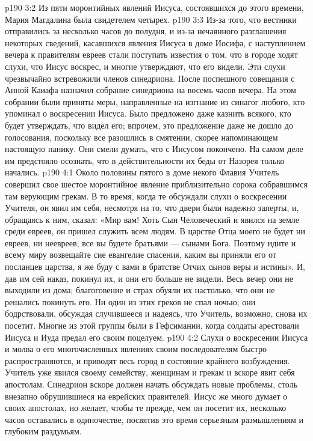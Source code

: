 \vs p190 3:2 \pc Из пяти моронтийных явлений Иисуса, состоявшихся до этого времени, Мария Магдалина была свидетелем четырех.
\vs p190 3:3 \pc Из\hyp{}за того, что вестники отправились за несколько часов до полудня, и из\hyp{}за нечаянного разглашения некоторых сведений, касавшихся явления Иисуса в доме Иосифа, с наступлением вечера к правителям евреев стали поступать известия о том, что в городе ходят слухи, что Иисус воскрес, и многие утверждают, что его видели. Эти слухи чрезвычайно встревожили членов синедриона. После поспешного совещания с Анной Каиафа назначил собрание синедриона на восемь часов вечера. На этом собрании были приняты меры, направленные на изгнание из синагог любого, кто упоминал о воскресении Иисуса. Было предложено даже казнить всякого, кто будет утверждать, что видел его; впрочем, это предложение даже не дошло до голосования, поскольку все разошлись в смятении, скорее напоминающем настоящую панику. Они смели думать, что с Иисусом покончено. На самом деле им предстояло осознать, что в действительности их беды от Назорея только начались.
\vs p190 4:1 Около половины пятого в доме некого Флавия Учитель совершил свое шестое моронтийное явление приблизительно сорока собравшимся там верующим грекам. В то время, когда те обсуждали слухи о воскресении Учителя, он явил им себя, несмотря на то, что двери были надежно заперты, и, обращаясь к ним, сказал: «Мир вам! Хоть Сын Человеческий и явился на земле среди евреев, он пришел служить всем людям. В царстве Отца моего не будет ни евреев, ни неевреев; все вы будете братьями --- сынами Бога. Поэтому идите и всему миру возвещайте сие евангелие спасения, каким вы приняли его от посланцев царства, я же буду с вами в братстве Отчих сынов веры и истины». И, дав им сей наказ, покинул их, и они его больше не видели. Весь вечер они не выходили из дома; благоговение и страх обуяли их настолько, что они не решались покинуть его. Ни один из этих греков не спал ночью; они бодрствовали, обсуждая случившееся и надеясь, что Учитель, возможно, снова их посетит. Многие из этой группы были в Гефсимании, когда солдаты арестовали Иисуса и Иуда предал его своим поцелуем.
\vs p190 4:2 \pc Слухи о воскресении Иисуса и молва о его многочисленных явлениях своим последователям быстро распространяются, и приводят весь город в состояние крайнего возбуждения. Учитель уже явился своему семейству, женщинам и грекам и вскоре явит себя апостолам. Синедрион вскоре должен начать обсуждать новые проблемы, столь внезапно обрушившиеся на еврейских правителей. Иисус же много думает о своих апостолах, но желает, чтобы те прежде, чем он посетит их, несколько часов оставались в одиночестве, посвятив это время серьезным размышлениям и глубоким раздумьям.
